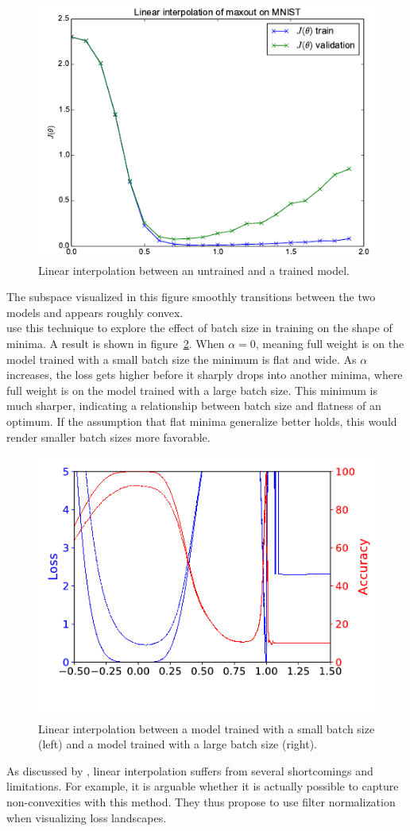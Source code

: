 \documentclass[a4paper]{scrartcl}
\begin{document}
\begin{figure}[H]
	\centering
	\includegraphics[width=.5\linewidth]{figures/linear_interpol_1.png}
	\caption{Linear interpolation between an untrained and a trained model.}
	\label{fig:untrained_trained}
\end{figure}
The subspace visualized in this figure smoothly transitions between the two models and appears roughly convex.\\
\citet{li2017visualizing} use this technique to explore the effect of batch size in training on the shape of minima. A result is shown in figure~\ref{fig:smallbatch_largebatch}. When $\alpha =0$, meaning full weight is on the model trained with a small batch size the minimum is flat and wide. As $\alpha$ increases, the loss gets higher before it sharply drops into another minima, where full weight is on the model trained with a large batch size. This minimum is much sharper, indicating a relationship between batch size and flatness of an optimum. If the assumption that flat minima generalize better holds, this would render smaller batch sizes more favorable.

\begin{figure}[H]
	\centering
	\includegraphics[width=.5\linewidth]{figures/batch_size_1.png}
	\caption{Linear interpolation between a model trained with a small batch size (left) and a model trained with a large batch size (right).}
	\label{fig:smallbatch_largebatch}
\end{figure}

As discussed by \citet{li2017visualizing}, linear interpolation suffers from several shortcomings  and limitations. For example, it is arguable whether it is actually possible to capture non-convexities with this method. They thus propose to use filter normalization when visualizing loss landscapes.
\end{document}
